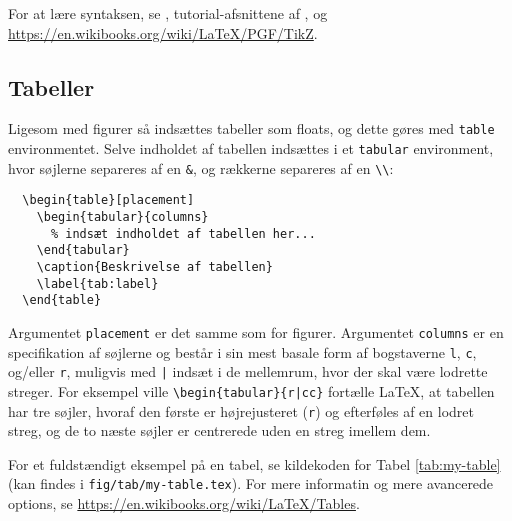 

For at lære syntaksen, se \citep{minimaltikz}, tutorial-afsnittene af \citep{tikzmanual}, og \url{https://en.wikibooks.org/wiki/LaTeX/PGF/TikZ}.


\subsection{Tabeller}
\label{sec:tables}

Ligesom med figurer så indsættes tabeller som floats, og dette gøres med \texttt{table} environmentet.
Selve indholdet af tabellen indsættes i et \texttt{tabular} environment, hvor søjlerne separeres af en \verb!&!, og rækkerne separeres af en \verb!\\!:

\begin{verbatim}
  \begin{table}[placement]
    \begin{tabular}{columns}
      % indsæt indholdet af tabellen her...
    \end{tabular}
    \caption{Beskrivelse af tabellen}
    \label{tab:label}
  \end{table}
\end{verbatim}

Argumentet \texttt{placement} er det samme som for figurer.
Argumentet \texttt{columns} er en specifikation af søjlerne og består i sin mest basale form af bogstaverne \texttt{l}, \texttt{c}, og/eller \texttt{r}, muligvis med \verb!|! indsæt i de mellemrum, hvor der skal være lodrette streger.
For eksempel ville \verb!\begin{tabular}{r|cc}! fortælle \LaTeX{}, at tabellen har tre søjler, hvoraf den første er højrejusteret (\texttt{r}) og efterføles af en lodret streg, og de to næste søjler er centrerede uden en streg imellem dem.

For et fuldstændigt eksempel på en tabel, se kildekoden for Tabel \ref{tab:my-table} (kan findes i \verb!fig/tab/my-table.tex!).
For mere informatin og mere avancerede options, se \url{https://en.wikibooks.org/wiki/LaTeX/Tables}.
